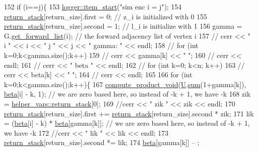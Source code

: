 \begin{DoxyCode}
152     \textcolor{keywordflow}{if} (i==j)\{
153       \hyperlink{classlogger_a7e21ec6ad2d40cfc2c6a383521b5641a}{logger::item\_start}(\textcolor{stringliteral}{"sim enc i = j"});
154       \hyperlink{namespacehelper__vars_a6d2100c373830cacd232319a9958652d}{return\_stack}[return\_size].first = 0; \textcolor{comment}{// z\_i is initialized with 0}
155       \hyperlink{namespacehelper__vars_a6d2100c373830cacd232319a9958652d}{return\_stack}[return\_size].second = 1; \textcolor{comment}{// l\_i is initialize with 1}
156       gamma = G.\hyperlink{classgraph_aa8fbee52a7b3604dbbd9175040c7ead5}{get\_forward\_list}(i); \textcolor{comment}{// the forward adjacency list of vertex i}
157       \textcolor{comment}{// cerr << " i " << i << " j " << j << " gamma: " << endl;}
158       \textcolor{comment}{// for (int k=0;k<gamma.size();k++)}
159       \textcolor{comment}{//   cerr << gamma[k] << " ";}
160       \textcolor{comment}{// cerr << endl;}
161       \textcolor{comment}{// cerr << " beta " << endl;}
162       \textcolor{comment}{// for (int k=0; k<n; k++)}
163       \textcolor{comment}{//   cerr << beta[k] << " ";}
164       \textcolor{comment}{// cerr << endl;}
165 
166       \textcolor{keywordflow}{for} (\textcolor{keywordtype}{int} k=0;k<gamma.size();k++)\{
167         \hyperlink{compression__helper_8cpp_af75857c18e9c23bb114e12642aa8c067}{compute\_product\_void}(\hyperlink{classgraph__encoder_a3314c40920f2ee132958a6b0ce7e7995}{U}.\hyperlink{classreverse__fenwick__tree_a672731fd6395b4853430073a099a80e6}{sum}(1+gamma[k]), \hyperlink{classgraph__encoder_a40880adecfd63fb86e94b4b0fc3f6bc2}{beta}[i] - k, 1); \textcolor{comment}{// we are zero
       based here, so instead of -k + 1, we have -k}
168         zik = \hyperlink{namespacehelper__vars_a6d2100c373830cacd232319a9958652d}{helper\_vars::return\_stack}[0];
169         \textcolor{comment}{//cerr << " zik " << zik << endl;}
170         \hyperlink{namespacehelper__vars_a6d2100c373830cacd232319a9958652d}{return\_stack}[return\_size].first += \hyperlink{namespacehelper__vars_a6d2100c373830cacd232319a9958652d}{return\_stack}[return\_size].second * zik;
171         lik = (\hyperlink{classgraph__encoder_a40880adecfd63fb86e94b4b0fc3f6bc2}{beta}[i] - k) * \hyperlink{classgraph__encoder_a40880adecfd63fb86e94b4b0fc3f6bc2}{beta}[gamma[k]]; \textcolor{comment}{// we are zero based here, so instead of -k + 1, we
       have -k}
172         \textcolor{comment}{//cerr << " lik " << lik << endl;}
173         \hyperlink{namespacehelper__vars_a6d2100c373830cacd232319a9958652d}{return\_stack}[return\_size].second *= lik;
174         \hyperlink{classgraph__encoder_a40880adecfd63fb86e94b4b0fc3f6bc2}{beta}[gamma[k]] -- ;

\end{DoxyCode}
